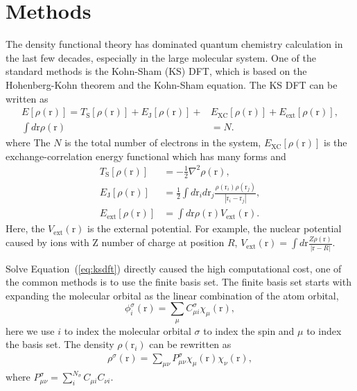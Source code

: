 \documentclass[%
twocolumn,
amsmath,amssymb,
groupedaddress,
reprint,%
]{revtex4-2}
\newcommand{\tS}{\mathrm{S}}
\renewcommand{\>}{\rangle}
\newcommand{\<}{\langle}
\newcommand{\Eq}[1]{Equation \,(\ref{#1})}
\newcommand{\XC}{\mathrm{XC}}
\newcommand{\brm}[1]{\bm{\mathrm{#1}}}
\newcommand{\ext}{\mathrm{ext}}
\begin{document}
\section{Methods}
The density functional theory has dominated quantum chemistry calculation in the last few decades, especially in the large molecular system.
% 
One of the standard methods is the Kohn-Sham (KS) DFT, which is based on the Hohenberg-Kohn theorem and the Kohn-Sham equation.
% 
The KS DFT can be written as
\begin{subequations}
    \label{eq:ksdft}
    \begin{align}
        E[\rho(\brm{r})] = T_{\tS}[\rho(\brm{r})] + E_{\textrm{J}}[\rho(\brm{r})] + & E_{\XC}[\rho(\brm{r})] + E_{\ext}[\rho(\brm{r})], \\
        \int d \brm{r} \rho(\brm{r})                                                & = N.
    \end{align}
\end{subequations}
where
The $N$ is the total number of electrons in the system, $E_{\XC}[\rho(\brm{r})]$ is the exchange-correlation energy functional which has many forms and
\begin{subequations}
    \begin{align}
        T_{\tS}[\rho(\brm{r})]        & = -\frac{1}{2} \nabla^2 \rho(\brm{r}),                                                                                  \\
        E_{\textrm{J}}[\rho(\brm{r})] & = \frac{1}{2} \int d \brm{r}_{i} d \brm{r}_{j} \frac{\rho(\brm{r}_{i}) \rho(\brm{r}_{j})}{|\brm{r}_{i} - \brm{r}_{j}|}, \\
        E_{\ext}[\rho(\brm{r})]       & = \int d \brm{r} \rho(\brm{r}) V_{\ext}(\brm{r}).
    \end{align}
\end{subequations}
Here, the $V_{\ext}(\brm{r})$ is the external potential. For example, the nuclear potential caused by ions with Z number of charge at position $R$, $V_{\ext}(\brm{r}) = \int d \brm{r} \frac{Z \rho(\brm{r})}{|\brm{r}-R|}$.

Solve \Eq{eq:ksdft} directly caused the high computational cost, one of the common methods is to use the finite basis set.
% 
The finite basis set starts with expanding the molecular orbital as the linear combination of the atom orbital,
\begin{equation}
    \phi^{\sigma}_i(\brm{r}) = \sum_{\mu} C^{\sigma}_{\mu i} \chi_{\mu}(\brm{r}),
\end{equation}
here we use $i$ to index the molecular orbital $\sigma$ to index the spin and $\mu$ to index the basis set.
% 
The density $\rho(\brm{r}_{i})$ can be rewritten as
\begin{equation}
    \begin{aligned}
        \rho^{\sigma}(\brm{r}) = \sum_{\mu \nu} P^{\sigma}_{\mu \nu} \chi_{\mu}(\brm{r}) \chi_{\nu}(\brm{r}),
    \end{aligned}
\end{equation}
where $P^{\sigma}_{\mu \nu} = \sum_{i}^{N_{\sigma}} C_{\mu i} C_{\nu i}$.
\end{document}
